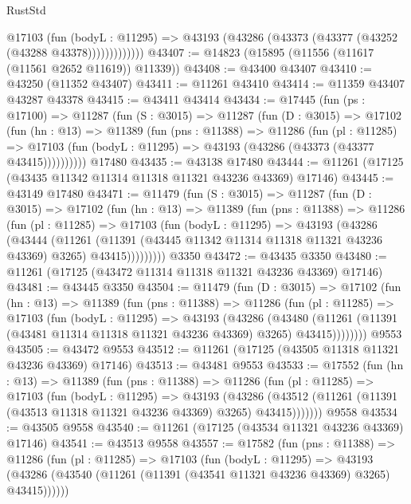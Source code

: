 \begin{lexlean}{RustStd}
\begin{coremodule}
                @17103
                  (fun (bodyL : @11295) =>
                  @43193 (@43286 (@43373 (@43377 (@43252 (@43288 @43378)))))))))))))
@43407 := @14823 (@15895 (@11556 (@11617 (@11561 @2652 @11619)) @11339))
@43408 := @43400 @43407
@43410 := @43250 (@11352 @43407)
@43411 := @11261 @43410
@43414 := @11359 @43407 @43287 @43378
@43415 := @43411 @43414
@43434 := @17445
    (fun (ps : @17100) =>
    @11287
      (fun (S : @3015) =>
      @11287
        (fun (D : @3015) =>
        @17102
          (fun (hn : @13) =>
          @11389
            (fun (pns : @11388) =>
            @11286
              (fun (pl : @11285) =>
              @17103 (fun (bodyL : @11295) => @43193 (@43286 (@43373 (@43377 @43415))))))))))
    @17480
@43435 := @43138 @17480
@43444 := @11261 (@17125 (@43435 @11342 @11314 @11318 @11321 @43236 @43369) @17146)
@43445 := @43149 @17480
@43471 := @11479
    (fun (S : @3015) =>
    @11287
      (fun (D : @3015) =>
      @17102
        (fun (hn : @13) =>
        @11389
          (fun (pns : @11388) =>
          @11286
            (fun (pl : @11285) =>
            @17103
              (fun (bodyL : @11295) =>
              @43193
                (@43286
                  (@43444
                    (@11261
                      (@11391 (@43445 @11342 @11314 @11318 @11321 @43236 @43369) @3265)
                      @43415)))))))))
    @3350
@43472 := @43435 @3350
@43480 := @11261 (@17125 (@43472 @11314 @11318 @11321 @43236 @43369) @17146)
@43481 := @43445 @3350
@43504 := @11479
    (fun (D : @3015) =>
    @17102
      (fun (hn : @13) =>
      @11389
        (fun (pns : @11388) =>
        @11286
          (fun (pl : @11285) =>
          @17103
            (fun (bodyL : @11295) =>
            @43193
              (@43286
                (@43480
                  (@11261 (@11391 (@43481 @11314 @11318 @11321 @43236 @43369) @3265) @43415))))))))
    @9553
@43505 := @43472 @9553
@43512 := @11261 (@17125 (@43505 @11318 @11321 @43236 @43369) @17146)
@43513 := @43481 @9553
@43533 := @17552
    (fun (hn : @13) =>
    @11389
      (fun (pns : @11388) =>
      @11286
        (fun (pl : @11285) =>
        @17103
          (fun (bodyL : @11295) =>
          @43193
            (@43286
              (@43512 (@11261 (@11391 (@43513 @11318 @11321 @43236 @43369) @3265) @43415)))))))
    @9558
@43534 := @43505 @9558
@43540 := @11261 (@17125 (@43534 @11321 @43236 @43369) @17146)
@43541 := @43513 @9558
@43557 := @17582
    (fun (pns : @11388) =>
    @11286
      (fun (pl : @11285) =>
      @17103
        (fun (bodyL : @11295) =>
        @43193 (@43286 (@43540 (@11261 (@11391 (@43541 @11321 @43236 @43369) @3265) @43415))))))

\end{coremodule}
\end{lexlean}
